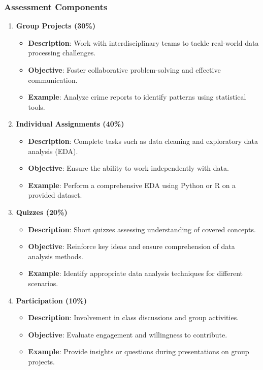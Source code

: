 \documentclass[aspectratio=169]{beamer}
\begin{document}
\begin{frame}[fragile]
    \frametitle{Assessment Components}
    \begin{enumerate}
        \item \textbf{Group Projects (30\%)}
            \begin{itemize}
                \item \textbf{Description}: Work with interdisciplinary teams to tackle real-world data processing challenges.
                \item \textbf{Objective}: Foster collaborative problem-solving and effective communication.
                \item \textbf{Example}: Analyze crime reports to identify patterns using statistical tools.
            \end{itemize}
        \item \textbf{Individual Assignments (40\%)}
            \begin{itemize}
                \item \textbf{Description}: Complete tasks such as data cleaning and exploratory data analysis (EDA).
                \item \textbf{Objective}: Ensure the ability to work independently with data.
                \item \textbf{Example}: Perform a comprehensive EDA using Python or R on a provided dataset.
            \end{itemize}
        \item \textbf{Quizzes (20\%)}
            \begin{itemize}
                \item \textbf{Description}: Short quizzes assessing understanding of covered concepts.
                \item \textbf{Objective}: Reinforce key ideas and ensure comprehension of data analysis methods.
                \item \textbf{Example}: Identify appropriate data analysis techniques for different scenarios.
            \end{itemize}
        \item \textbf{Participation (10\%)}
            \begin{itemize}
                \item \textbf{Description}: Involvement in class discussions and group activities.
                \item \textbf{Objective}: Evaluate engagement and willingness to contribute.
                \item \textbf{Example}: Provide insights or questions during presentations on group projects.
            \end{itemize}
    \end{enumerate}
\end{frame}
\end{document}
